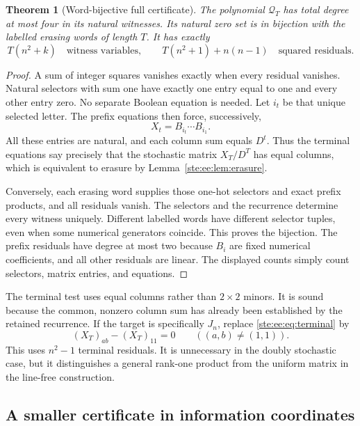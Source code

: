 \documentclass[11pt,letterpaper]{article}
\newtheorem{theorem}{Theorem}[section]
\theoremstyle{definition}
\theoremstyle{remark}
\begin{document}
\begin{theorem}[Word-bijective full certificate]\label{ste:ee:thm:fullcertificate}
The polynomial $\mathcal Q_T$ has total degree at most four in its natural
witnesses. Its natural zero set is in bijection with the labelled erasing words
of length $T$. It has exactly
\begin{equation}
 T(n^2+k)\quad\text{witness variables},\qquad
 T(n^2+1)+n(n-1)\quad\text{squared residuals}.
 \label{ste:ee:eq:fullcounts}
\end{equation}
\end{theorem}
\begin{proof}
A sum of integer squares vanishes exactly when every residual vanishes. Natural
selectors with sum one have exactly one entry equal to one and every other entry
zero. No separate Boolean equation is needed. Let $i_t$ be that unique selected
letter. The prefix equations then force, successively,
\[
 X_t=B_{i_t}\cdots B_{i_1}.
\]
All these entries are natural, and each column sum equals $D^t$. Thus the
terminal equations say precisely that the stochastic matrix $X_T/D^T$ has equal
columns, which is equivalent to erasure by Lemma~\ref{ste:ee:lem:erasure}.

Conversely, each erasing word supplies those one-hot selectors and exact prefix
products, and all residuals vanish. The selectors and the recurrence determine
every witness uniquely. Different labelled words have different selector tuples,
even when some numerical generators coincide. This proves the bijection.
The prefix residuals have degree at most two because $B_i$ are fixed numerical
coefficients, and all other residuals are linear. The displayed counts simply
count selectors, matrix entries, and equations.
\end{proof}

The terminal test uses equal columns rather than $2\times2$ minors. It is sound
because the common, nonzero column sum has already been established by the
retained recurrence. If the target is specifically $J_n$, replace
\eqref{ste:ee:eq:terminal} by
\[
 (X_T)_{ab}-(X_T)_{11}=0\qquad ((a,b)\ne(1,1)).
\]
This uses $n^2-1$ terminal residuals. It is unnecessary in the doubly stochastic
case, but it distinguishes a general rank-one product from the uniform matrix
in the line-free construction.

\subsection{A smaller certificate in information coordinates}
\end{document}
